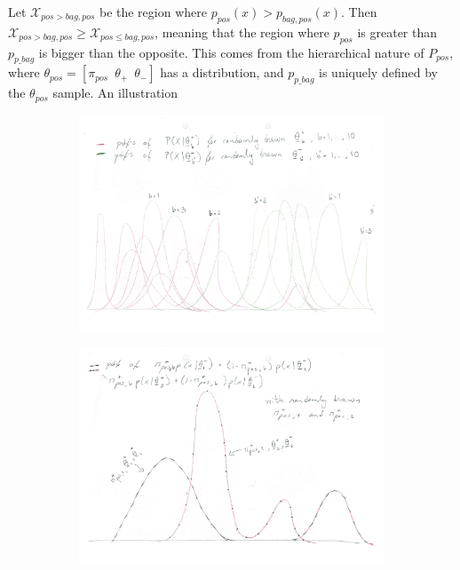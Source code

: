 Let $\mathcal{X}_{pos>{bag,pos}}$ be the region where $p_{pos}(x)>p_{bag,pos}(x)$. 
Then $\mathcal{X}_{pos>{bag,pos}} \geq \mathcal{X}_{pos \leq {bag,pos}}$, 
meaning that the region where $p_{pos}$ is greater than $p_{p\_ bag}$ is bigger than the opposite. 
This comes from the hierarchical nature of $P_{pos}$, where $\theta_{pos} = [\pi_{pos} \,\,\,\theta_+ \,\,\,\theta_-]$ has a distribution, and $p_{p\_ bag}$ is uniquely defined by the $\theta_{pos}$ sample. 
An illustration
\begin{figure}[!h]
  \centering
  \begin{subfigure}{}
    \includegraphics[height = 0.3\textheight]{Figures/distrs.pdf}
  \end{subfigure}    
  \begin{subfigure}{}
    \includegraphics[height = 0.3\textheight]{Figures/pos.pdf}

\end{subfigure}
\end{figure}
